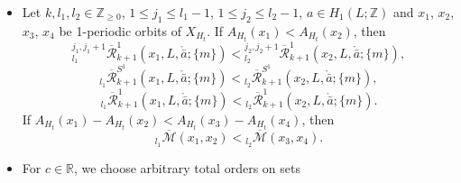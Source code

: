\documentclass[a4paper]{article}
\numberwithin{equation}{section}
\begin{document}
\begin{itemize}
\begin{equation}
    \overline{\mathcal{R}}_{k_1+2,\vartheta}(L,\bar{a}_1;\{m\})<\overline{\mathcal{R}}_{k_2+2,\vartheta}(L,\bar{a}_2;\{m\}),
    \end{equation}
    \begin{equation}
    {}_{l_1}^{j_1,j_1+1}\overline{\mathcal{R}}_{k_1+1}^1(x,L,\ring{\bar{a}}_1;\{m\})<{}_{l_2}^{j_2,j_2+1}\overline{\mathcal{R}}_{k_2+1}^1(x,L,\ring{\bar{a}}_2;\{m\}),
    \end{equation}
    \begin{equation}
    {}_{l_1}\overline{\mathcal{R}}_{k_1+1}^{S^1}(x,L,\ring{\bar{a}}_1;\{m\})<{}_{l_2}\overline{\mathcal{R}}_{k_2+1}^{S^1}(x,L,\ring{\bar{a}}_2;\{m\}),
    \end{equation}
    \begin{equation}
    {}_{l_1}\overline{\mathcal{R}}_{k_1+1}^1(x,L,\ring{\bar{a}}_1;\{m\})<{}_{l_2}\overline{\mathcal{R}}_{k_2+1}^1(x,L,\ring{\bar{a}}_2;\{m\}).
    \end{equation}
    \item[(vi)] Let $k,l_1,l_2\in\mathbb{Z}_{\geq0}$, $1\leq j_1\leq l_1-1$, $1\leq j_2\leq l_2-1$, $a\in H_1(L;\mathbb{Z})$ and $x_1$, $x_2$, $x_3$, $x_4$ be 1-periodic orbits of $X_{H_t}$. If $A_{H_t}(x_1)<A_{H_t}(x_2)$, then
    \begin{equation}
    {}_{l_1}^{j_1,j_1+1}\overline{\mathcal{R}}_{k+1}^1(x_1,L,\ring{\bar{a}};\{m\})<{}_{l_2}^{j_2,j_2+1}\overline{\mathcal{R}}_{k+1}^1(x_2,L,\ring{\bar{a}};\{m\}),
    \end{equation}
    \begin{equation}
    {}_{l_1}\overline{\mathcal{R}}_{k+1}^{S^1}(x_1,L,\ring{\bar{a}};\{m\})<{}_{l_2}\overline{\mathcal{R}}_{k+1}^{S^1}(x_2,L,\ring{\bar{a}};\{m\}),
    \end{equation}
    \begin{equation}
    {}_{l_1}\overline{\mathcal{R}}_{k+1}^1(x_1,L,\ring{\bar{a}};\{m\})<{}_{l_2}\overline{\mathcal{R}}_{k+1}^1(x_2,L,\ring{\bar{a}};\{m\}).
    \end{equation}
    If $A_{H_t}(x_1)-A_{H_t}(x_2)<A_{H_t}(x_3)-A_{H_t}(x_4)$, then
    \begin{equation}
    {}_{l_1}\overline{\mathcal{M}}(x_1,x_2)<{}_{l_2}\overline{\mathcal{M}}(x_3,x_4).
    \end{equation}
    \item[(vii)] For $c\in\mathbb{R}$, we choose arbitrary total orders on sets

\end{itemize}
\end{document}

